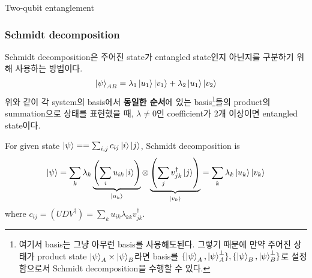 \documentclass[9pt]{beamer}
\begin{document}
\begin{section}{Two-qubit entanglement}
        \begin{frame}
            \frametitle{Schmidt decomposition}
            \alert{Schmidt decomposition}은 주어진 state가 entangled state인지 아닌지를 구분하기 위해 사용하는 방법이다.
            \begin{equation*}
                \ket{\psi}_{AB} = \lambda_1 \ket{u_1} \ket{v_1}  + \lambda_2 \ket{u_1}\ket{v_2}
            \end{equation*}
            위와 같이 각 system의 basis에서 \textbf{동일한 순서}에 있는 basis\footnote{여기서 basis는 그냥 아무런 basis를 사용해도된다. 그렇기 때문에 만약 주어진 상태가 product state $\ket{\psi}_A \times \ket{\psi}_B$라면 basis를 $\{\ket{\psi}_A, \ket{\psi}_A^\perp\}, \{\ket{\psi}_B, \ket{\psi}_B^\perp\}$로 설정함으로서 Schmidt decomposition을 수행할 수 있다. }들의 product의 summation으로 상태를 표현했을 때, $\lambda \ne 0$인 coefficient가 2개 이상이면 entangled state이다.  
            \begin{theorem}
                For given state $\ket \psi= = \sum_{i,j} c_{ij} \ket{i} \ket{j}$, Schmidt decomposition is 
                \begin{equation*}
                    \ket{\psi} = \sum_k \lambda_k \underbrace{\left(\sum_i u_{ik} \ket i\right)}_{\ket{u_k}} \otimes  \underbrace{\left(\sum_j v_{jk}^\dagger \ket{j}\right)}_{\ket{v_k}}  = \sum_k \lambda_k \ket{u_k} \ket{v_k}
                \end{equation*}
                where $c_{ij} = (UDV^\dagger) = \sum_k u_{ik} \lambda_{kk} v_{jk}^\dagger$.
            \end{theorem}
        \end{frame}
    \end{section}
\end{document}
